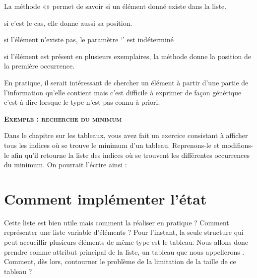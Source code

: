 \begin{liste}
		La méthode «» permet de savoir si un élément
		donné existe dans la liste. 
	\item 
		si c’est le cas, elle donne aussi sa position.
	\item 
		si l’élément n’existe pas, le paramètre ‘’ est
		indéterminé 
	\item 
		si l’élément est présent en plusieurs exemplaires, la méthode donne la
		position de la première occurrence.
	\item 
		En pratique, il serait intéressant de chercher un élément à partir d’une
		partie de l’information qu’elle contient mais c’est difficile à
		exprimer de façon générique c'est-à-dire lorsque le
		type n'est pas connu à priori.
\end{liste}

\bigskip

{\sffamily\bfseries\scshape
Exemple : recherche du minimum}

Dans le chapitre sur les tableaux, vous avez fait un exercice consistant
à afficher tous les indices où se trouve le minimum d’un tableau.
Reprenons-le et modifions-le afin qu’il retourne la liste des indices
où se trouvent les différentes occurrences du minimum. On pourrait
l’écrire ainsi :


\bigskip

\section{Comment implémenter l’état}

Cette liste est bien utile mais comment la réaliser en pratique ?
Comment représenter une liste variable d’éléments ? Pour
l'instant, la seule structure qui peut accueillir
plusieurs éléments de même type est le tableau. Nous allons donc
prendre comme attribut principal de la liste, un tableau que nous
appellerons . Comment, dès lors, contourner
le problème de la limitation de la taille de ce tableau ?

